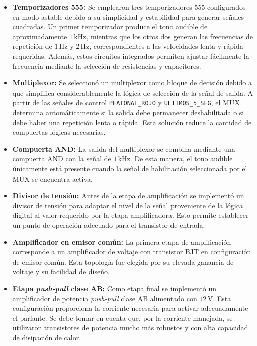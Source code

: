 \documentclass[12pt, journal, onecolumn]{IEEEtran}
\begin{document}
\begin{itemize}
    \item \textbf{Temporizadores 555:} Se emplearon tres temporizadores 555 configurados en modo astable debido a su simplicidad y estabilidad para generar señales cuadradas. Un primer temporizador produce el tono audible de aproximadamente $1\,\mathrm{kHz}$, mientras que los otros dos generan las frecuencias de repetición de $1\,\mathrm{Hz}$ y $2\,\mathrm{Hz}$, correspondientes a las velocidades lenta y rápida requeridas. Además, estos circuitos integrados permiten ajustar fácilmente la frecuencia mediante la selección de resistencias y capacitores.\\

    \item \textbf{Multiplexor:} Se seleccionó un multiplexor como bloque de decisión debido a que simplifica considerablemente la lógica de selección de la señal de salida. A partir de las señales de control \texttt{PEATONAL\_ROJO} y \texttt{ULTIMOS\_5\_SEG}, el MUX determina automáticamente si la salida debe permanecer deshabilitada o si debe haber una repetición lenta o rápida. Esta solución reduce la cantidad de compuertas lógicas necesarias.\\

    \item \textbf{Compuerta AND:} La salida del multiplexor se combina mediante una compuerta AND con la señal de $1\,\mathrm{kHz}$. De esta manera, el tono audible únicamente está presente cuando la señal de habilitación seleccionada por el MUX se encuentra activa.\\

    \item \textbf{Divisor de tensión:} Antes de la etapa de amplificación se implementó un divisor de tensión para adaptar el nivel de la señal proveniente de la lógica digital al valor requerido por la etapa amplificadora. Esto permite establecer un punto de operación adecuado para el transistor de entrada.\\

    \item \textbf{Amplificador en emisor común:} La primera etapa de amplificación corresponde a un amplificador de voltaje con transistor BJT en configuración de emisor común. Esta topología fue elegida por su elevada ganancia de voltaje y su facilidad de diseño.\\

    \item \textbf{Etapa \textit{push-pull} clase AB:} Como etapa final se implementó un amplificador de potencia \textit{push-pull} clase AB alimentado con $12\,\mathrm{V}$. Esta configuración proporciona la corriente necesaria para activar adecuadamente el parlante. Se debe tomar en cuenta que, por la corriente manejada, se utilizaron transistores de potencia mucho más robustos y con alta capacidad de disipación de calor.\\


\end{itemize}
\end{document}
